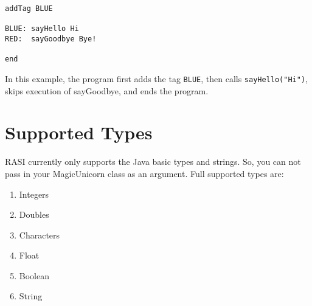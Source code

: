 \documentclass{article}
\begin{document}
\begin{verbatim}
addTag BLUE

BLUE: sayHello Hi
RED:  sayGoodbye Bye!

end
\end{verbatim}
In this example, the program first adds the tag \texttt{BLUE}, then calls \texttt{sayHello("Hi")}, skips execution of sayGoodbye, and ends the program.

\section{Supported Types}
RASI currently only supports the Java basic types and strings. So, you can not pass in your MagicUnicorn class as an argument. Full supported types are:
\begin{enumerate}
    \item Integers
    \item Doubles
    \item Characters
    \item Float
    \item Boolean
    \item String
\end{enumerate}
\end{document}
